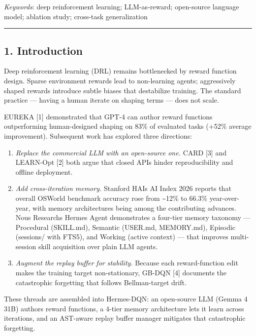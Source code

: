 \emph{Keywords}: deep reinforcement learning; LLM-as-reward; open-source language model; ablation study; cross-task generalization

\begin{center}\rule{0.5\linewidth}{0.5pt}\end{center}

\subsection{1. Introduction}\label{1-introduction}

Deep reinforcement learning (DRL) remains bottlenecked by reward function design. Sparse environment rewards lead to non-learning agents; aggressively shaped rewards introduce subtle biases that destabilize training. The standard practice --- having a human iterate on shaping terms --- does not scale.

EUREKA {[}1{]} demonstrated that GPT-4 can author reward functions outperforming human-designed shaping on 83\% of evaluated tasks (+52\% average improvement). Subsequent work has explored three directions:

\begin{enumerate}
\def\labelenumi{\arabic{enumi}.}
\tightlist
\item
  \emph{Replace the commercial LLM with an open-source one.} CARD {[}3{]} and LEARN-Opt {[}2{]} both argue that closed APIs hinder reproducibility and offline deployment.
\item
  \emph{Add cross-iteration memory.} Stanford HAI\textquotesingle s AI Index 2026 reports that overall OSWorld benchmark accuracy rose from \textasciitilde12\% to 66.3\% year-over-year, with memory architectures being among the contributing advances. Nous Research\textquotesingle s Hermes Agent demonstrates a four-tier memory taxonomy --- Procedural (SKILL.md), Semantic (USER.md, MEMORY.md), Episodic (sessions/ with FTS5), and Working (active context) --- that improves multi-session skill acquisition over plain LLM agents.
\item
  \emph{Augment the replay buffer for stability.} Because each reward-function edit makes the training target non-stationary, GB-DQN {[}4{]} documents the catastrophic forgetting that follows Bellman-target drift.
\end{enumerate}

These threads are assembled into Hermes-DQN: an open-source LLM (Gemma 4 31B) authors reward functions, a 4-tier memory architecture lets it learn across iterations, and an AST-aware replay buffer manager mitigates that catastrophic forgetting.

